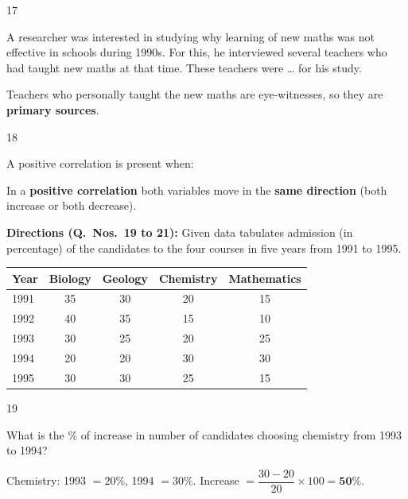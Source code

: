 \begin{question}{17}
{A researcher was interested in studying why learning of new maths was not effective in schools during 1990s. For this, he interviewed several teachers who had taught new maths at that time. These teachers were \ldots{} for his study.\par}
\begin{explain}
Teachers who personally taught the new maths are eye-witnesses, so they are \textbf{primary sources}.
\end{explain}
\end{question}

\begin{question}{18}
{A positive correlation is present when:\par}
\begin{explain}
In a \textbf{positive correlation} both variables move in the \textbf{same direction} (both increase or both decrease).
\end{explain}
\end{question}

\begin{context}
\textbf{Directions (Q.~Nos.~19 to 21):} Given data tabulates admission (in percentage) of the candidates to the four courses in five years from 1991 to 1995.
\begin{center}\small
\begin{tabular}{lcccc}\toprule \textbf{Year} & \textbf{Biology} & \textbf{Geology} & \textbf{Chemistry} & \textbf{Mathematics}\\\midrule
1991 & 35 & 30 & 20 & 15\\ 1992 & 40 & 35 & 15 & 10\\ 1993 & 30 & 25 & 20 & 25\\ 1994 & 20 & 20 & 30 & 30\\ 1995 & 30 & 30 & 25 & 15\\\bottomrule
\end{tabular}
\end{center}
\end{context}
\begin{question}{19}
{What is the \% of increase in number of candidates choosing chemistry from 1993 to 1994?\par}
\begin{explain}
Chemistry: 1993 $=20\%$, 1994 $=30\%$. Increase $=\dfrac{30-20}{20}\times100=\mathbf{50\%}$.
\end{explain}
\end{question}

